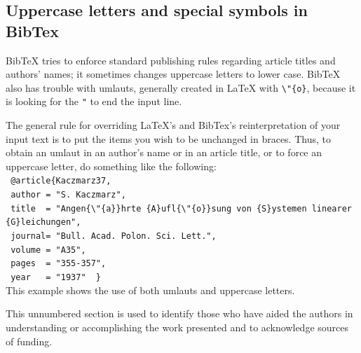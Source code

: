 \documentclass[a4paper]{spie}  %
\begin{document}
\subsection{Uppercase letters and special symbols in BibTex} 

BibTeX tries to enforce standard publishing rules regarding article titles and authors' names; it sometimes changes uppercase letters to lower case. BibTeX also has trouble with umlauts, generally created in LaTeX with \verb+\"{o}+, because it is looking for the \verb+"+ to end the input line. 

The general rule for overriding LaTeX's and BibTex's reinterpretation of your input text is to put the items you wish to be unchanged in braces. Thus, to obtain an umlaut in an author's name or in an article title, or to force an uppercase letter, do something like the following: \\[1ex]
\verb+ @article{Kaczmarz37,+ \\ 
\verb+ author = "S. Kaczmarz",+ \\ 
\verb+ title  = "Angen{\"{a}}hrte {A}ufl{\"{o}}sung von {S}ystemen linearer {G}leichungen",+ \\ 
\verb+ journal= "Bull. Acad. Polon. Sci. Lett.",+ \\ 
\verb+ volume = "A35",+ \\ 
\verb+ pages  = "355-357",+ \\	
\verb+ year   = "1937"	} + \\[1ex]
This example shows the use of both umlauts and uppercase letters.
\acknowledgments     %
 
This unnumbered section is used to identify those who have aided the authors in understanding or accomplishing the work presented and to acknowledge sources of funding.  


\end{document}
